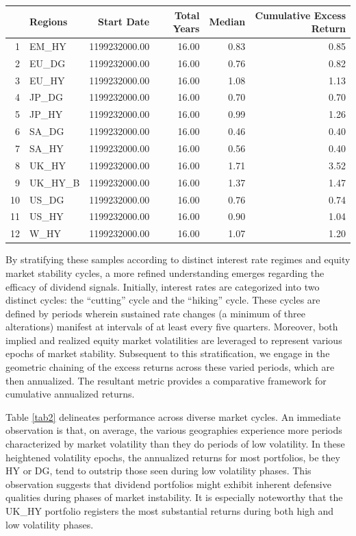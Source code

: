 \documentclass[11pt,preprint, authoryear]{elsarticle}
\let\origtable\table
\let\endorigtable\endtable
\renewenvironment{table}[1][2] {
    \expandafter\origtable\expandafter[H]
} {
    \endorigtable
}
\numberwithin{equation}{section}
\numberwithin{figure}{section}
\numberwithin{table}{section}
\begin{document}
\begin{table}[H]
\centering
\begin{tabular}{rlrrrr}
  \hline
 & Regions & Start Date & Total Years & Median & Cumulative Excess Return \\ 
  \hline
1 & EM\_HY & 1199232000.00 & 16.00 & 0.83 & 0.85 \\ 
  2 & EU\_DG & 1199232000.00 & 16.00 & 0.76 & 0.82 \\ 
  3 & EU\_HY & 1199232000.00 & 16.00 & 1.08 & 1.13 \\ 
  4 & JP\_DG & 1199232000.00 & 16.00 & 0.70 & 0.70 \\ 
  5 & JP\_HY & 1199232000.00 & 16.00 & 0.99 & 1.26 \\ 
  6 & SA\_DG & 1199232000.00 & 16.00 & 0.46 & 0.40 \\ 
  7 & SA\_HY & 1199232000.00 & 16.00 & 0.56 & 0.40 \\ 
  8 & UK\_HY & 1199232000.00 & 16.00 & 1.71 & 3.52 \\ 
  9 & UK\_HY\_B & 1199232000.00 & 16.00 & 1.37 & 1.47 \\ 
  10 & US\_DG & 1199232000.00 & 16.00 & 0.76 & 0.74 \\ 
  11 & US\_HY & 1199232000.00 & 16.00 & 0.90 & 1.04 \\ 
  12 & W\_HY & 1199232000.00 & 16.00 & 1.07 & 1.20 \\ 
   \hline
\end{tabular}
\caption{Cumulative Excess Return \label{tab1}} 
\end{table}

By stratifying these samples according to distinct interest rate regimes
and equity market stability cycles, a more refined understanding emerges
regarding the efficacy of dividend signals. Initially, interest rates
are categorized into two distinct cycles: the ``cutting'' cycle and the
``hiking'' cycle. These cycles are defined by periods wherein sustained
rate changes (a minimum of three alterations) manifest at intervals of
at least every five quarters. Moreover, both implied and realized equity
market volatilities are leveraged to represent various epochs of market
stability. Subsequent to this stratification, we engage in the geometric
chaining of the excess returns across these varied periods, which are
then annualized. The resultant metric provides a comparative framework
for cumulative annualized returns.

Table \ref{tab2} delineates performance across diverse market cycles. An
immediate observation is that, on average, the various geographies
experience more periods characterized by market volatility than they do
periods of low volatility. In these heightened volatility epochs, the
annualized returns for most portfolios, be they HY or DG, tend to
outstrip those seen during low volatility phases. This observation
suggests that dividend portfolios might exhibit inherent defensive
qualities during phases of market instability. It is especially
noteworthy that the UK\_HY portfolio registers the most substantial
returns during both high and low volatility phases.
\end{document}
